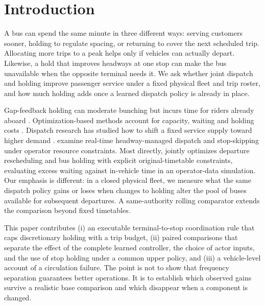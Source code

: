 \section{Introduction}

A bus can spend the same minute in three different ways: serving customers sooner, holding to regulate spacing, or returning to cover the next scheduled trip. Allocating more trips to a peak helps only if vehicles can actually depart. Likewise, a hold that improves headways at one stop can make the bus unavailable when the opposite terminal needs it. We ask whether joint dispatch and holding improve passenger service under a fixed physical fleet and trip roster, and how much holding adds once a learned dispatch policy is already in place.

Gap-feedback holding can moderate bunching but incurs time for riders already aboard \citep{daganzo2009headway,xuan2011dynamic,berrebi2018comparing}. Optimization-based methods account for capacity, waiting and holding costs \citep{eberlein2001holding,hickman2001analytic,delgado2012much,sanchez2016realtime}. Dispatch research has studied how to shift a fixed service supply toward higher demand \citep{newell1971dispatching}. \citet{sanchez2017schedulefree} examine real-time headway-managed dispatch and stop-skipping under operator resource constraints. Most directly, \citet{gkiotsalitis2021rescheduling} jointly optimizes departure rescheduling and bus holding with explicit original-timetable constraints, evaluating excess waiting against in-vehicle time in an operator-data simulation. Our emphasis is different: in a closed physical fleet, we measure what the same dispatch policy gains or loses when changes to holding alter the pool of buses available for subsequent departures. A same-authority rolling comparator extends the comparison beyond fixed timetables.

This paper contributes (i) an executable terminal-to-stop coordination rule that caps discretionary holding with a trip budget, (ii) paired comparisons that separate the effect of the complete learned controller, the choice of actor inputs, and the use of stop holding under a common upper policy, and (iii) a vehicle-level account of a circulation failure. The point is not to show that frequency separation guarantees better operations. It is to establish which observed gains survive a realistic base comparison and which disappear when a component is changed.
